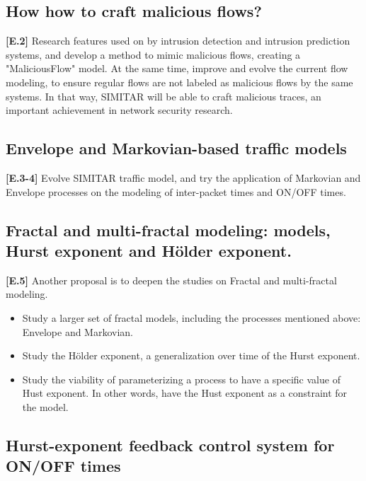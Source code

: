 \subsection{How how to craft malicious flows?}

\textbf{[E.2]} Research features used on by intrusion detection and intrusion prediction systems, and develop a method to mimic malicious flows, creating a "MaliciousFlow" model. At the same time, improve and evolve the current flow modeling, to ensure regular flows are not labeled as malicious flows by the same systems.  In that way, SIMITAR will be able to craft malicious traces, an important achievement in network security research.

\subsection{Envelope and Markovian-based traffic models}

\textbf{[E.3-4]} Evolve SIMITAR traffic model, and try the application of  Markovian and Envelope processes on the modeling of inter-packet times and ON/OFF times.
 
\subsection{Fractal and multi-fractal modeling: models, Hurst exponent and  Hölder exponent.}

\textbf{[E.5]} Another proposal is to deepen the studies on Fractal and multi-fractal modeling. 

\begin{itemize}
\item Study a larger set of fractal models, including the processes mentioned above: Envelope and Markovian.  
\item Study the Hölder exponent\cite{holder-exponent}, a generalization over time of the Hurst exponent. 
\item Study the viability of parameterizing a process to have a specific value of Hust exponent. In other words, have the Hust exponent as a constraint for the model.
\end{itemize}

\subsection{Hurst-exponent feedback control system for ON/OFF times}

